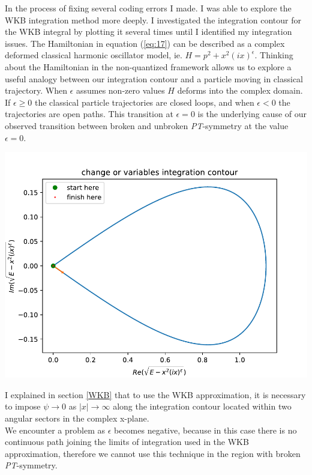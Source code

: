 \documentclass[10pt, a4paper, singlespacing]{report}
\newenvironment{Figure}
    {\par\medskip\noindent\minipage{\linewidth}}
    {\endminipage\par\medskip}
\newcommand\PT{\emph{PT}}
\begin{document}
In the process of fixing several coding errors I made. I was able to explore the WKB integration method more deeply. I investigated the integration contour for the WKB integral by plotting it several times until I identified my integration issues. The Hamiltonian in equation (\ref{eq:17}) can be described as a complex deformed classical harmonic oscillator model, ie. $H = p^2 + x^2(ix)^{\epsilon}$. Thinking about the Hamiltonian in the non-quantized framework allows us to explore a useful analogy between our integration contour and a particle moving in classical trajectory. When $\epsilon$ assumes non-zero values $H$ deforms into the complex domain\cite{BenderPT}. If $\epsilon \geq 0$ the classical particle trajectories are closed loops, and when $\epsilon < 0$ the trajectories are open paths. This transition at $\epsilon = 0$ is the underlying cause of our observed transition between broken and unbroken \PT-symmetry at the value $\epsilon = 0$.
\begin{Figure}
 \centering
 \includegraphics[width=0.75\linewidth]{integration_contour.pdf}
\end{Figure}
I explained in section \ref{WKB} that to use the WKB approximation, it is necessary to impose $\psi \rightarrow 0$ as $|x| \rightarrow \infty$ along the integration contour located within two angular sectors in the complex x-plane.\\ We encounter a problem as $\epsilon$ becomes negative, because in this case there is no continuous path joining the limits of integration used in the WKB approximation, therefore we cannot use this technique in the region with broken \PT-symmetry.\\
\end{document}
